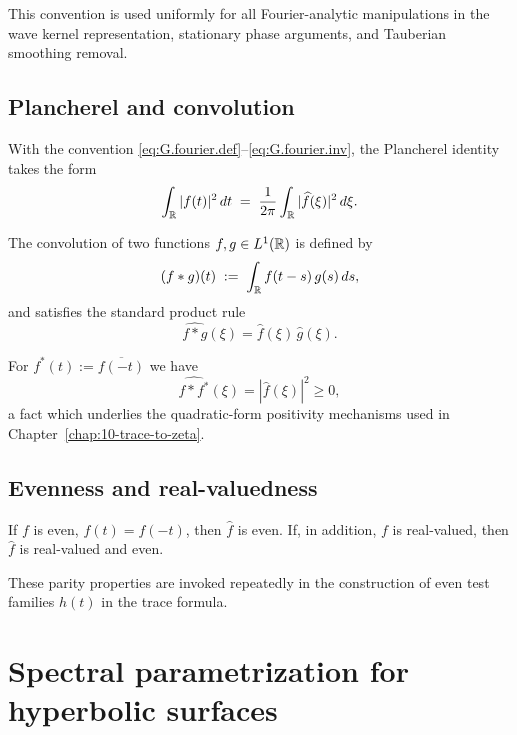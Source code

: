 This convention is used uniformly for all Fourier-analytic manipulations in the wave kernel representation,
stationary phase arguments, and Tauberian smoothing removal.

\subsection{Plancherel and convolution}
\label{subsec:G.fourier.plancherel}

With the convention \eqref{eq:G.fourier.def}--\eqref{eq:G.fourier.inv}, the Plancherel identity takes the form
\begin{equation}\label{eq:G.plancherel}
\int_{\mathbb{R}}|f(t)|^2\,dt
\;=\;
\frac{1}{2\pi}\int_{\mathbb{R}}|\widehat{f}(\xi)|^2\,d\xi.
\end{equation}

The convolution of two functions $f,g\in L^1(\mathbb{R})$ is defined by
\begin{equation}\label{eq:G.convolution.def}
(f\ast g)(t)
\;:=\;
\int_{\mathbb{R}} f(t-s)\,g(s)\,ds,
\end{equation}
and satisfies the standard product rule
\begin{equation}\label{eq:G.convolution.rule}
\widehat{f\ast g}(\xi)=\widehat{f}(\xi)\,\widehat{g}(\xi).
\end{equation}

For $f^\ast(t):=\overline{f(-t)}$ we have
\begin{equation}\label{eq:G.convolution.square}
\widehat{f\ast f^\ast}(\xi)=|\widehat{f}(\xi)|^2\ge 0,
\end{equation}
a fact which underlies the quadratic-form positivity mechanisms used in Chapter~\ref{chap:10-trace-to-zeta}.

\subsection{Evenness and real-valuedness}
\label{subsec:G.fourier.even}

If $f$ is even, $f(t)=f(-t)$, then $\widehat{f}$ is even.  If, in addition, $f$ is real-valued, then $\widehat{f}$ is
real-valued and even.

These parity properties are invoked repeatedly in the construction of even test families $h(t)$ in the trace formula.

\section{Spectral parametrization for hyperbolic surfaces}
\label{sec:G.spectral.param}

